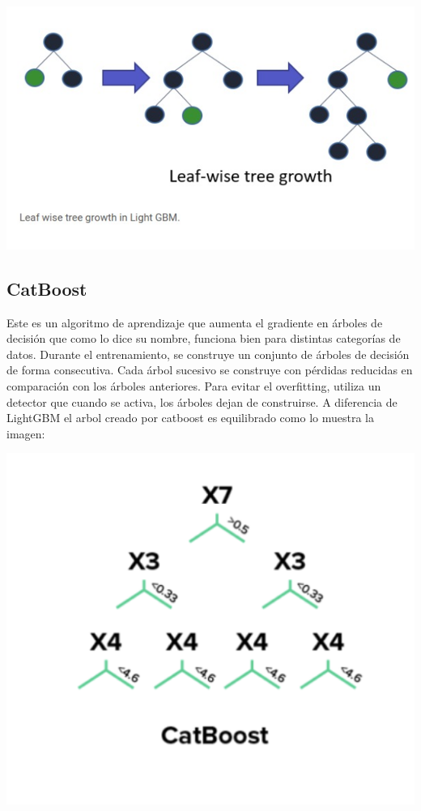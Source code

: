 \documentclass[12pt,a4paper]{article}
\begin{document}
\begin{center}
    \includegraphics[scale=0.5]{imgs/lightgbm.jpeg}
\end{center}

\subsection{CatBoost}
Este es un algoritmo de aprendizaje que aumenta el gradiente en árboles de decisión que como lo dice su nombre, funciona bien para distintas categorías de datos.
Durante el entrenamiento, se construye un conjunto de árboles de decisión de forma consecutiva. Cada árbol sucesivo se construye con pérdidas reducidas en comparación con los árboles anteriores.
Para evitar el overfitting, utiliza un detector que cuando se activa, los árboles dejan de construirse.
A diferencia de LightGBM el arbol creado por catboost es equilibrado como lo muestra la imagen:

\begin{center}
    \includegraphics[scale=0.5]{imgs/catboost.png}
\end{center}
\end{document}
